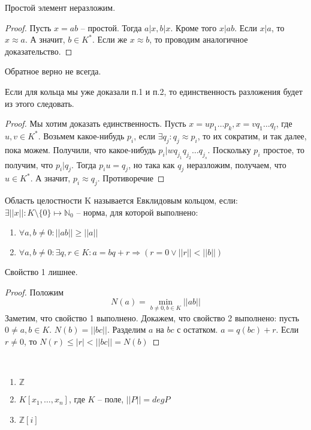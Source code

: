 \documentclass[document.tex]{subfiles}
\begin{document}
\begin{statement}
	Простой элемент неразложим.
\end{statement}

\begin{proof}
	Пусть $x = ab$ -- простой. Тогда $a|x, b|x$. Кроме того $x | ab$. Если $x|a$, то $x \approx a$. А значит, $b \in K^*$. Если же $x \approx b$, то проводим аналогичное доказательство. 
\end{proof}

\begin{remark}
	Обратное верно не всегда.
\end{remark}

\begin{statement}
	Если для кольца мы уже доказали п.1 и п.2, то единственность разложения будет из этого следовать.
\end{statement}

\begin{proof}
	Мы хотим доказать единственность. Пусть $x = up_1 \ldots p_k, x = vq_1 \ldots q_l$, где $u, v \in K^*$. Возьмем какое-нибудь $p_i$, если $\exists q_j: q_j \approx p_i$, то их сократим, и так далее, пока можем. Получили, что какое-нибудь $p_i | w q_{j_1} q_{j_2} \ldots q_{j_s}$. Поскольку $p_i$ простое, то получим, что $p_i | q_j$. Тогда $p_i u = q_j$, но така как $q_j$ неразложим, получаем, что $u \in K^*$. А значит, $p_i \approx q_j$. Противоречие
\end{proof}

\begin{definition}
	Область целостности K называется Евклидовым кольцом, если: $\exists ||x|| : K \setminus \{0\} \mapsto \mathbb{N}_0$ -- норма, для которой выполнено:
	\begin{enumerate}
		\item $\forall a, b \neq 0: ||ab|| \geq ||a||$
		\item $\forall a, b \neq 0: \exists q, r \in K : a = bq+r \Rightarrow (r = 0 \vee ||r|| < ||b||)$
	\end{enumerate}
\end{definition}

\begin{statement}
	Свойство 1 лишнее.
\end{statement}

\begin{proof}
	Положим
	$$N(a) = \min_{b \neq 0, b \in K} ||ab||$$
	Заметим, что свойство 1 выполнено. Докажем, что свойство 2 выполнено: пусть $0 \neq a, b \in K$. $N(b) = ||bc||$. Разделим $a$ на $bc$ с остатком. $a = q(bc) + r$. Если $r \neq 0$, то $N(r) \leq |r| < ||bc|| = N(b)$
	
\end{proof}

\begin{example}
	~\begin{enumerate}
		\item $\mathbb{Z}$
		\item $K[x_1, \ldots, x_n]$, где $K$ -- поле, $||P|| = deg P$
		\item $\mathbb{Z}[i]$
	\end{enumerate}
\end{example}
\end{document}

